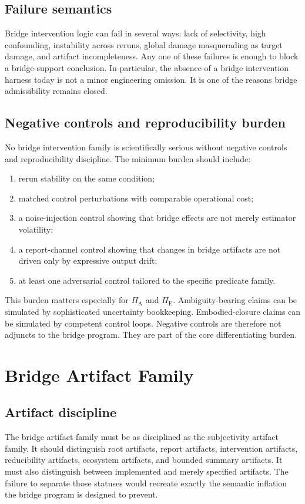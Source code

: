 \documentclass[11pt,a4paper]{article}
\theoremstyle{definition}
\newcommand{\PiA}{\Pi_{\mathrm{A}}}
\newcommand{\PiE}{\Pi_{\mathrm{E}}}
\begin{document}
\subsection{Failure semantics}
Bridge intervention logic can fail in several ways: lack of selectivity, high confounding, instability across reruns, global damage masquerading as target damage, and artifact incompleteness. Any one of these failures is enough to block a bridge-support conclusion. In particular, the absence of a bridge intervention harness today is not a minor engineering omission. It is one of the reasons bridge admissibility remains closed.

\subsection{Negative controls and reproducibility burden}
No bridge intervention family is scientifically serious without negative controls and reproducibility discipline. The minimum burden should include:
\begin{enumerate}[leftmargin=1.5em]
\item rerun stability on the same condition;
\item matched control perturbations with comparable operational cost;
\item a noise-injection control showing that bridge effects are not merely estimator volatility;
\item a report-channel control showing that changes in bridge artifacts are not driven only by expressive output drift;
\item at least one adversarial control tailored to the specific predicate family.
\end{enumerate}

This burden matters especially for $\PiA$ and $\PiE$. Ambiguity-bearing claims can be simulated by sophisticated uncertainty bookkeeping. Embodied-closure claims can be simulated by competent control loops. Negative controls are therefore not adjuncts to the bridge program. They are part of the core differentiating burden.

\section{Bridge Artifact Family}
\subsection{Artifact discipline}
The bridge artifact family must be as disciplined as the subjectivity artifact family. It should distinguish root artifacts, report artifacts, intervention artifacts, reducibility artifacts, ecosystem artifacts, and bounded summary artifacts. It must also distinguish between implemented and merely specified artifacts. The failure to separate those statuses would recreate exactly the semantic inflation the bridge program is designed to prevent.
\end{document}

